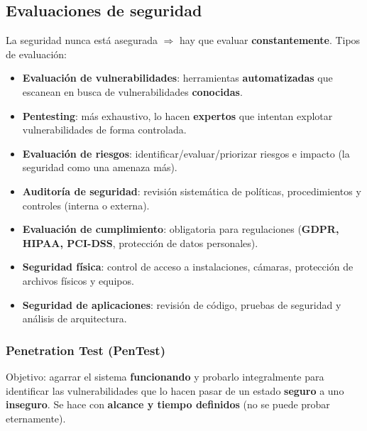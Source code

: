 \documentclass[../main.tex]{subfiles}
\begin{document}
\subsection{Evaluaciones de seguridad}


La seguridad nunca está asegurada $\Rightarrow$ hay que evaluar
\textbf{constantemente}. Tipos de evaluación:
\begin{itemize}
  \item \textbf{Evaluación de vulnerabilidades}: herramientas
    \textbf{automatizadas} que escanean en busca de vulnerabilidades
    \textbf{conocidas}.
  \item \textbf{Pentesting}: más exhaustivo, lo hacen \textbf{expertos} que
    intentan explotar vulnerabilidades de forma controlada.
  \item \textbf{Evaluación de riesgos}: identificar/evaluar/priorizar riesgos e
    impacto (la seguridad como una amenaza más).
  \item \textbf{Auditoría de seguridad}: revisión sistemática de políticas,
    procedimientos y controles (interna o externa).
  \item \textbf{Evaluación de cumplimiento}: obligatoria para regulaciones
    (\textbf{GDPR, HIPAA, PCI-DSS}, protección de datos personales).
  \item \textbf{Seguridad física}: control de acceso a instalaciones, cámaras,
    protección de archivos físicos y equipos.
  \item \textbf{Seguridad de aplicaciones}: revisión de código, pruebas de
    seguridad y análisis de arquitectura.
\end{itemize}

\subsubsection{Penetration Test (PenTest)}
Objetivo: agarrar el sistema \textbf{funcionando} y probarlo integralmente para
identificar las vulnerabilidades que lo hacen pasar de un estado \textbf{seguro}
a uno \textbf{inseguro}. Se hace con \textbf{alcance y tiempo definidos} (no se
puede probar eternamente).
\end{document}
